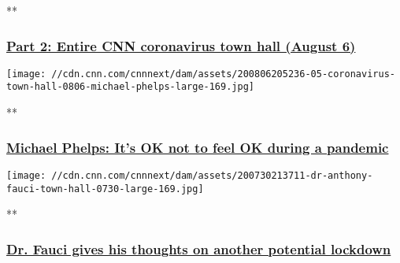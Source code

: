 **

\hypertarget{part-2-entire-cnn-coronavirus-town-hall-august-6-1}{%
\subsubsection{\texorpdfstring{\href{/videos/health/2020/08/06/entire-august-6-coronavirus-town-hall-part-2-sot-vpx.cnn}{Part
2: Entire CNN coronavirus town hall (August
6)}}{Part 2: Entire CNN coronavirus town hall (August 6)}}\label{part-2-entire-cnn-coronavirus-town-hall-august-6-1}}

\href{/videos/health/2020/08/07/michael-phelps-mental-health-challenges-pandemic-town-hall-vpx.cnn/video/playlists/cnn-coronavirus-town-hall/}{}

\texttt{[image: //cdn.cnn.com/cnnnext/dam/assets/200806205236-05-coronavirus-town-hall-0806-michael-phelps-large-169.jpg]}

**

\hypertarget{michael-phelps-its-ok-not-to-feel-ok-during-a-pandemic}{%
\subsubsection{\texorpdfstring{\href{/videos/health/2020/08/07/michael-phelps-mental-health-challenges-pandemic-town-hall-vpx.cnn/video/playlists/cnn-coronavirus-town-hall/}{Michael
Phelps: It's OK not to feel OK during a
pandemic}}{Michael Phelps: It's OK not to feel OK during a pandemic}}\label{michael-phelps-its-ok-not-to-feel-ok-during-a-pandemic}}

\href{/videos/health/2020/07/31/fauci-another-lockdown-coronavirus-pandemic-curve-impossible-predict-town-hall-bts-vpx.cnn/video/playlists/cnn-coronavirus-town-hall/}{}

\texttt{[image: //cdn.cnn.com/cnnnext/dam/assets/200730213711-dr-anthony-fauci-town-hall-0730-large-169.jpg]}

**

\hypertarget{dr-fauci-gives-his-thoughts-on-another-potential-lockdown}{%
\subsubsection{\texorpdfstring{\href{/videos/health/2020/07/31/fauci-another-lockdown-coronavirus-pandemic-curve-impossible-predict-town-hall-bts-vpx.cnn/video/playlists/cnn-coronavirus-town-hall/}{Dr.
Fauci gives his thoughts on another potential
lockdown}}{Dr. Fauci gives his thoughts on another potential lockdown}}\label{dr-fauci-gives-his-thoughts-on-another-potential-lockdown}}

